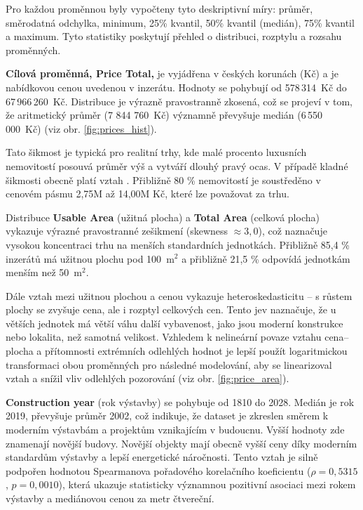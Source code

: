Pro každou proměnnou byly vypočteny tyto deskriptivní míry: průměr, směrodatná odchylka, minimum, 25\% kvantil, 50\% kvantil (medián), 75\% kvantil a maximum. Tyto statistiky poskytují přehled o distribuci, rozptylu a rozsahu proměnných.

\textbf{Cílová proměnná, Price Total,} je vyjádřena v českých korunách (Kč) a je nabídkovou cenou uvedenou v inzerátu. Hodnoty se pohybují od 578\,314~Kč do 67\,966\,260~Kč. Distribuce je výrazně pravostranně zkosená, což se projeví v tom, že aritmetický průměr (7 844 760~Kč) významně převyšuje medián (6\,550\,000~Kč) (viz obr. \ref{fig:prices_hist}).

Tato šikmost je typická pro realitní trhy, kde malé procento luxusních nemovitostí posouvá průměr výš a vytváří dlouhý pravý ocas. V případě kladné šikmosti obecně platí vztah . Přibližně 80 \% nemovitostí je soustředěno v cenovém pásmu 2,75M až 14,00M Kč, které lze považovat za  trhu.

Distribuce \textbf{Usable Area} (užitná plocha) a \textbf{Total Area} (celková plocha) vykazuje výrazné pravostranné zešikmení (skewness $\approx 3{,}0$), což naznačuje vysokou koncentraci trhu na menších standardních jednotkách. Přibližně 85{,}4 \% inzerátů má užitnou plochu pod 100~$\mathrm{m}^2$ a přibližně 21{,}5 \% odpovídá jednotkám menším než 50~$\mathrm{m}^2$.

Dále vztah mezi užitnou plochou a cenou vykazuje heteroskedasticitu -- s růstem plochy se zvyšuje cena, ale i rozptyl celkových cen. Tento jev naznačuje, že u větších jednotek má větší váhu další vybavenost, jako jsou moderní konstrukce nebo lokalita, než samotná velikost.
Vzhledem k nelineární povaze vztahu cena–plocha a přítomnosti extrémních odlehlých hodnot je lepší použít logaritmickou transformaci obou proměnných pro následné modelování, aby se linearizoval vztah a snížil vliv odlehlých pozorování (viz obr. \ref{fig:price_area}).

\textbf{Construction year} (rok výstavby) se pohybuje od 1810 do 2028. Medián je rok 2019, převyšuje průměr 2002, což indikuje, že dataset je zkreslen směrem k moderním výstavbám a projektům vznikajícím v budoucnu. Vyšší hodnoty zde znamenají novější budovy. Novější objekty mají obecně vyšší ceny díky moderním standardům výstavby a lepší energetické náročnosti. Tento vztah je silně podpořen hodnotou Spearmanova pořadového korelačního koeficientu ($\rho = 0{,}5315$, $p = 0{,}0010$), která ukazuje statisticky významnou pozitivní asociaci mezi rokem výstavby a mediánovou cenou za metr čtvereční.

